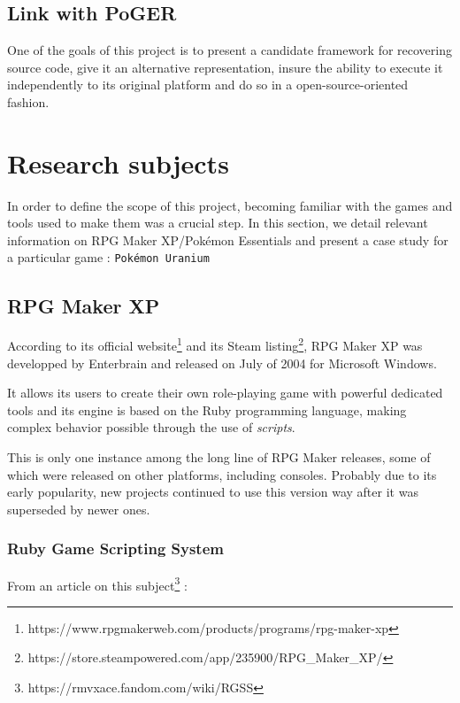 \documentclass[11pt]{article}
\begin{document}
\subsection{Link with PoGER}

One of the goals of this project is to present a candidate framework for recovering source code, give it an alternative representation, insure the ability to execute it independently to its original platform and do so in a open-source-oriented fashion.




\newpage
\section{Research subjects}

In order to define the scope of this project, becoming familiar with the games and tools used to make them was a crucial step. In this section, we detail relevant information on RPG Maker XP/Pokémon Essentials and present a case study for a particular game : \texttt{Pokémon Uranium}

\subsection{RPG Maker XP}


According to its official website\footnote{https://www.rpgmakerweb.com/products/programs/rpg-maker-xp} and its Steam listing\footnote{https://store.steampowered.com/app/235900/RPG\_Maker\_XP/}, RPG Maker XP was developped by Enterbrain and released on July of 2004 for Microsoft Windows. 

It allows its users to create their own role-playing game with powerful dedicated tools and its engine is based on the Ruby programming language, making complex behavior possible through the use of \textit{scripts}.


This is only one instance among the long line of RPG Maker releases, some of which were released on other platforms, including consoles. Probably due to its early popularity, new projects continued to use this version way after it was superseded by newer ones.



\subsubsection{Ruby Game Scripting System}

From an article on this subject\footnote{https://rmvxace.fandom.com/wiki/RGSS} : 
\end{document}
